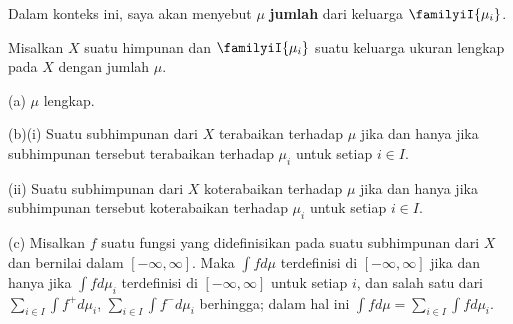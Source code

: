 
\medskip

 Dalam konteks ini, saya akan menyebut $\mu$
{\bf jumlah} dari keluarga $\familyiI{\mu_i}$.

 Misalkan $X$ suatu himpunan dan $\familyiI{\mu_i}$ suatu keluarga ukuran
lengkap pada $X$ dengan jumlah $\mu$.

(a) $\mu$ lengkap.

(b)(i) Suatu subhimpunan dari $X$ terabaikan terhadap $\mu$ jika dan
hanya jika subhimpunan tersebut terabaikan terhadap $\mu_i$ untuk setiap
$i\in I$.

\quad(ii) Suatu subhimpunan dari $X$ koterabaikan terhadap $\mu$ jika dan
hanya jika subhimpunan tersebut koterabaikan terhadap $\mu_i$ untuk setiap
$i\in I$.

(c)
 Misalkan $f$ suatu fungsi yang didefinisikan pada suatu subhimpunan dari
$X$ dan bernilai dalam $[-\infty,\infty]$. Maka $\int fd\mu$ terdefinisi di
$[-\infty,\infty]$ jika dan hanya jika $\int fd\mu_i$ terdefinisi di
$[-\infty,\infty]$ untuk setiap $i$, dan salah satu dari
$\sum_{i\in I}\int f^+d\mu_i$, $\sum_{i\in I}\int f^-d\mu_i$ berhingga; dalam hal
ini $\int fd\mu=\sum_{i\in I}\int fd\mu_i$.

